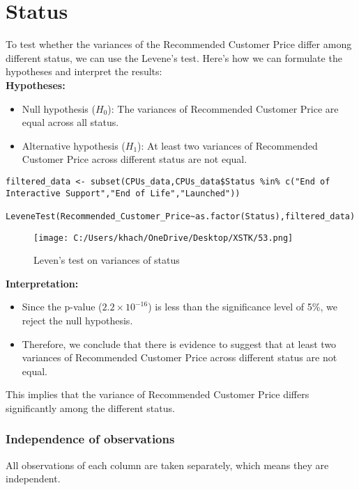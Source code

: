\documentclass[a4paper]{article}
\begin{document}
	 \section*{Status}
	 To test whether the variances of the Recommended Customer Price differ among different status, we can use the Levene's test. Here's how we can formulate the hypotheses and interpret the results:\\
	 \textbf{Hypotheses:}
	 \begin{itemize}
	 	\item Null hypothesis (\( H_0 \)): The variances of Recommended Customer Price are equal across all status.
	 	\item Alternative hypothesis (\( H_1 \)): At least two variances of Recommended Customer Price across different status are not equal.
	 \end{itemize}
	 \newpage
	 \begin{lstlisting}[frame=single, backgroundcolor=\color{gray!10}, breaklines=true, columns=fullflexible]
	 filtered_data <- subset(CPUs_data,CPUs_data$Status %in% c("End of Interactive Support","End of Life","Launched"))
	 LeveneTest(Recommended_Customer_Price~as.factor(Status),filtered_data)
	 \end{lstlisting}
	 \begin{figure}[htbp]
	 	\centering
	 	\begin{adjustbox}{width=0.7\textwidth, frame}
	 		\texttt{[image: C:/Users/khach/OneDrive/Desktop/XSTK/53.png]}
	 	\end{adjustbox}
	 	\captionsetup{justification=centering}
	 	\vspace{0.5cm}
	 	\caption{Leven's test on variances of status}
	 \end{figure}
	 \textbf{Interpretation:}
	 \begin{itemize}
	 	\item Since the p-value (\(2.2 \times 10^{-16}\)) is less than the significance level of 5\%, we reject the null hypothesis.
	 	\item Therefore, we conclude that there is evidence to suggest that at least two variances of Recommended Customer Price across different status are not equal.
	 \end{itemize}
	 
	 This implies that the variance of Recommended Customer Price differs significantly among the different status.
	\subsubsection{Independence of observations}
    All observations of each column are taken separately, which means they are independent.
\end{document}
